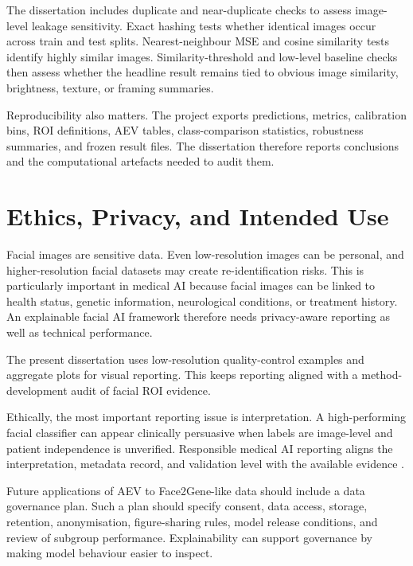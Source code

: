The dissertation includes duplicate and near-duplicate checks to assess image-level leakage sensitivity. Exact hashing tests whether identical images occur across train and test splits. Nearest-neighbour MSE and cosine similarity tests identify highly similar images. Similarity-threshold and low-level baseline checks then assess whether the headline result remains tied to obvious image similarity, brightness, texture, or framing summaries.


Reproducibility also matters. The project exports predictions, metrics, calibration bins, ROI definitions, AEV tables, class-comparison statistics, robustness summaries, and frozen result files. The dissertation therefore reports conclusions and the computational artefacts needed to audit them.


\section{Ethics, Privacy, and Intended Use}

Facial images are sensitive data. Even low-resolution images can be personal, and higher-resolution facial datasets may create re-identification risks. This is particularly important in medical AI because facial images can be linked to health status, genetic information, neurological conditions, or treatment history. An explainable facial AI framework therefore needs privacy-aware reporting as well as technical performance.


The present dissertation uses low-resolution quality-control examples and aggregate plots for visual reporting. This keeps reporting aligned with a method-development audit of facial ROI evidence.


Ethically, the most important reporting issue is interpretation. A high-performing facial classifier can appear clinically persuasive when labels are image-level and patient independence is unverified. Responsible medical AI reporting aligns the interpretation, metadata record, and validation level with the available evidence  .


Future applications of AEV to Face2Gene-like data should include a data governance plan. Such a plan should specify consent, data access, storage, retention, anonymisation, figure-sharing rules, model release conditions, and review of subgroup performance. Explainability can support governance by making model behaviour easier to inspect.


